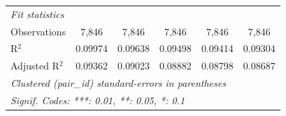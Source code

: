 \begin{tabular}{lccccc}
   \midrule
   \emph{Fit statistics}\\
   Observations    & 7,846          & 7,846          & 7,846          & 7,846          & 7,846\\  
   R$^2$           & 0.09974        & 0.09638        & 0.09498        & 0.09414        & 0.09304\\  
   Adjusted R$^2$  & 0.09362        & 0.09023        & 0.08882        & 0.08798        & 0.08687\\  
   \midrule \midrule
   \multicolumn{6}{l}{\emph{Clustered (pair\_id) standard-errors in parentheses}}\\
   \multicolumn{6}{l}{\emph{Signif. Codes: ***: 0.01, **: 0.05, *: 0.1}}\\
\end{tabular}
\par\endgroup


